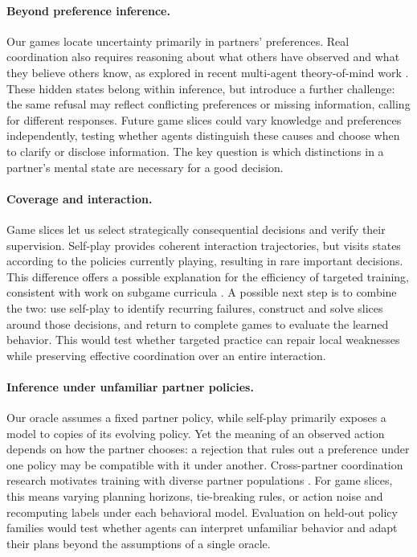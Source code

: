 \paragraph{Beyond preference inference.}
Our games locate uncertainty primarily in partners' preferences. Real
coordination also requires reasoning about what others have observed and
what they believe others know, as explored in recent multi-agent theory-of-mind
work \citep{ys2026sotopiatom,mu2026adaptive,cross2025hypothetical}. These hidden
states belong within inference, but introduce a further challenge: the same
refusal may reflect conflicting preferences or missing information, calling
for different responses. Future game slices could vary knowledge and
preferences independently, testing whether agents distinguish these causes
and choose when to clarify or disclose information. The
key question is which distinctions in a partner's mental state are necessary
for a good decision.

\paragraph{Coverage and interaction.}
Game slices let us select strategically consequential decisions and verify
their supervision. Self-play provides coherent interaction trajectories, but
visits states according to the policies currently playing, resulting in rare important decisions. This difference offers a possible explanation for the
efficiency of targeted training, consistent with work on subgame
curricula \citep{chen2024subgame}. A possible next step is to combine
the two: use self-play to identify recurring failures, construct and solve
slices around those decisions, and return to complete games to evaluate the
learned behavior. This would test whether targeted practice can repair local
weaknesses while preserving effective coordination over an entire interaction.

\paragraph{Inference under unfamiliar partner policies.}
Our oracle assumes a fixed partner policy, while self-play primarily exposes
a model to copies of its evolving policy. Yet the meaning of an observed
action depends on how the partner chooses: a rejection that rules out a
preference under one policy may be compatible with it under another.
Cross-partner coordination research motivates training with diverse partner
populations \citep{hu2020otherplay,strouse2021collaborating}. For game slices,
this means varying planning horizons, tie-breaking rules, or action noise and
recomputing labels under each behavioral model. Evaluation on held-out
policy families would test whether agents can interpret unfamiliar behavior
and adapt their plans beyond the assumptions of a single oracle.
